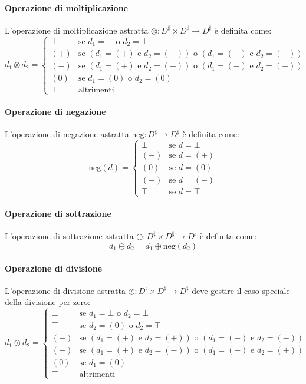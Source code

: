 \paragraph{Operazione di moltiplicazione}
L'operazione di moltiplicazione astratta $\otimes: D^\sharp \times D^\sharp \to D^\sharp$
è definita come:
\[
d_1 \otimes d_2 =
\begin{cases}
    \bot & \text{se } d_1 = \bot \text{ o } d_2 = \bot \\
    (+) & \text{se } (d_1 = (+) \text{ e } d_2 = (+)) \text{ o } (d_1 = (-) \text{ e } d_2 = (-)) \\
    (-) & \text{se } (d_1 = (+) \text{ e } d_2 = (-)) \text{ o } (d_1 = (-) \text{ e } d_2 = (+)) \\
    (0) & \text{se } d_1 = (0) \text{ o } d_2 = (0) \\
    \top & \text{altrimenti}
\end{cases}
\]

\paragraph{Operazione di negazione}
L'operazione di negazione astratta $\text{neg}: D^\sharp \to D^\sharp$
è definita come:
\[
\text{neg}(d) =
\begin{cases}
    \bot & \text{se } d = \bot \\
    (-) & \text{se } d = (+) \\
    (0) & \text{se } d = (0) \\
    (+) & \text{se } d = (-) \\
    \top & \text{se } d = \top
\end{cases}
\]

\paragraph{Operazione di sottrazione}
L'operazione di sottrazione astratta $\ominus: D^\sharp \times D^\sharp \to D^\sharp$
è definita come:
\[
d_1 \ominus d_2 = d_1 \oplus \text{neg}(d_2)
\]

\paragraph{Operazione di divisione}
L'operazione di divisione astratta $\oslash: D^\sharp \times D^\sharp \to D^\sharp$
deve gestire il caso speciale della divisione per zero:
\[
d_1 \oslash d_2 =
\begin{cases}
    \bot & \text{se } d_1 = \bot \text{ o } d_2 = \bot \\
    \top & \text{se } d_2 = (0) \text{ o } d_2 = \top \\
    (+) & \text{se } (d_1 = (+) \text{ e } d_2 = (+)) \text{ o } (d_1 = (-) \text{ e } d_2 = (-)) \\
    (-) & \text{se } (d_1 = (+) \text{ e } d_2 = (-)) \text{ o } (d_1 = (-) \text{ e } d_2 = (+)) \\
    (0) & \text{se } d_1 = (0) \\
    \top & \text{altrimenti}
\end{cases}
\]

